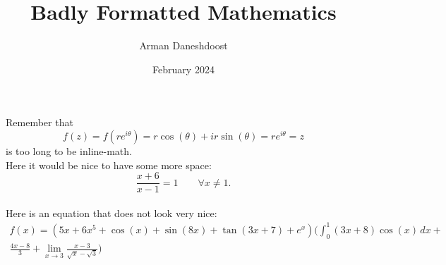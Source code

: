 \documentclass{article}
\title{Badly Formatted Mathematics}
\author{Arman Daneshdoost}
\date{February 2024}
\begin{document}
	\maketitle
	Remember that \[f(z) = f(re^{i\theta}) = r\cos(\theta) + ir\sin(\theta) = re^{i\theta} = z\]
	is too long to be inline-math.
	\\
	Here it would be nice to have some more space:
	\[\frac{x+6}{x-1} = 1\qquad \forall x\neq1.\]
	\\
	Here is an equation that does not look very nice:
	\begin{multline*}
		f(x) = (5x + 6x^5 + \cos(x) + \sin(8x) + \tan(3x+7)+e^x)\Bigg(\int_{0}^{1}(3x+8)\cos(x)\,dx + \\
		 \frac{4x-8}{3} +\lim_{x\to3}\frac{x-3}{\sqrt{x} - \sqrt{3}}\Bigg)
	\end{multline*}
\end{document}
